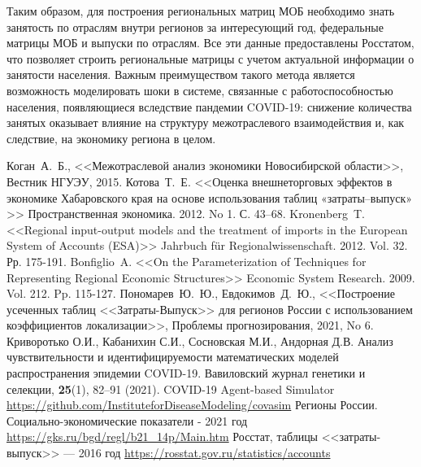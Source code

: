\documentclass[12pt, a4paper]{article}
\begin{document}
Таким образом, для построения региональных матриц МОБ необходимо знать занятость по отраслям внутри регионов за интересующий год, федеральные матрицы МОБ и выпуски по отраслям. Все эти данные предоставлены Росстатом, что позволяет строить региональные матрицы с учетом актуальной информации о занятости населения. Важным преимуществом такого метода является возможность моделировать шоки в системе, связанные с работоспособностью населения, появляющиеся вследствие пандемии COVID-19: снижение количества занятых оказывает влияние на структуру межотраслевого взаимодействия и, как следствие, на экономику региона в целом.
\newpage
\begin{thebibliography}{00}
Коган~А.~Б., <<Межотраслевой анализ экономики Новосибирской области>>, Вестник НГУЭУ, 2015.
Котова~Т.~Е. <<Оценка внешнеторговых эффектов в экономике Хабаровского
края на основе использования таблиц «затраты–выпуск» >> Пространственная
экономика. 2012. No 1. С. 43–68.
Kronenberg~T. <<Regional input-output models and the treatment of imports in the European System of Accounts (ESA)>> Jahrbuch für Regionalwissenschaft. 2012. Vol. 32. Рр. 175-191.
Bonfiglio~A. <<On the Parameterization of Techniques for Representing Regional Economic Structures>> Economic System Research. 2009. Vol. 212. Pp. 115-127.
Пономарев~Ю.~Ю., Евдокимов~Д.~Ю., <<Построение усеченных таблиц <<Затраты-Выпуск>> для регионов России с использованием коэффициентов локализации>>, Проблемы прогнозирования, 2021, No 6.
 Криворотько О.И., Кабанихин С.И., Сосновская М.И., Андорная Д.В. Анализ чувствительности и идентифицируемости математических моделей распространения эпидемии COVID-19. Вавиловский журнал генетики и селекции, \textbf{25}(1), 82--91 (2021).
COVID-19 Agent-based Simulator \underline{https://github.com/InstituteforDiseaseModeling/covasim}
Регионы России. Социально-экономические показатели - 2021 год \underline{https://gks.ru/bgd/regl/b21\_14p/Main.htm}
Росстат, таблицы <<затраты-выпуск>> --- 2016 год \underline{https://rosstat.gov.ru/statistics/accounts}
\end{thebibliography}
\end{document}
